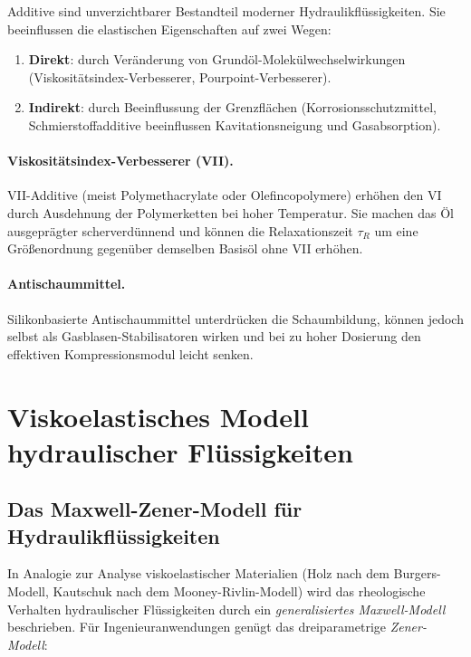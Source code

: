 ﻿\documentclass[a4paper,12pt]{scrreprt}
\theoremstyle{definition}
\begin{document}
Additive sind unverzichtbarer Bestandteil moderner Hydraulikflüssigkeiten.
Sie beeinflussen die elastischen Eigenschaften auf zwei Wegen:

\begin{enumerate}
  \item \textbf{Direkt}: durch Veränderung von Grundöl-Molekülwechselwirkungen
    (Viskositätsindex-Verbesserer, Pourpoint-Verbesserer).
  \item \textbf{Indirekt}: durch Beeinflussung der Grenzflächen
    (Korrosionsschutzmittel, Schmierstoffadditive beeinflussen Kavitationsneigung
    und Gasabsorption).
\end{enumerate}

\paragraph{Viskositätsindex-Verbesserer (VII).}
VII-Additive (meist Polymethacrylate oder Olefincopolymere) erhöhen den VI
durch Ausdehnung der Polymerketten bei hoher Temperatur. Sie machen das Öl
ausgeprägter scherverdünnend und können die Relaxationszeit $\tau_R$
um eine Größenordnung gegenüber demselben Basisöl ohne VII erhöhen.

\paragraph{Antischaummittel.}
Silikonbasierte Antischaummittel unterdrücken die Schaumbildung, können
jedoch selbst als Gasblasen-Stabilisatoren wirken und bei zu hoher
Dosierung den effektiven Kompressionsmodul leicht senken.

\section{Viskoelastisches Modell hydraulischer Flüssigkeiten}

\subsection{Das Maxwell-Zener-Modell für Hydraulikflüssigkeiten}

In Analogie zur Analyse viskoelastischer Materialien (Holz nach dem
Burgers-Modell, Kautschuk nach dem Mooney-Rivlin-Modell) wird das
rheologische Verhalten hydraulischer Flüssigkeiten durch ein
\emph{generalisiertes Maxwell-Modell} beschrieben. Für
Ingenieuranwendungen genügt das dreiparametrige \emph{Zener-Modell}:
\end{document}
